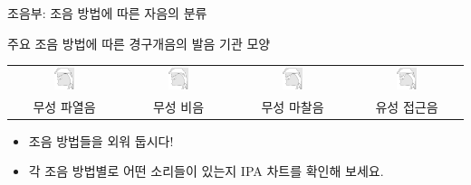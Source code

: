 \documentclass[11pt, aspectratio=169]{beamer}
\begin{document}
\begin{frame}[t]{조음부: 조음 방법에 따른 자음의 분류}
    \begin{block}{주요 조음 방법에 따른 경구개음의 발음 기관 모양}
        \centering
        \begin{tabular}{cccc}
            \includegraphics[width=0.2\textwidth]{img/Voiceless_palatal_plosive.svg.png} &  \includegraphics[width=0.2\textwidth]{img/Voiceless_palatal_nasal.svg.png} & \includegraphics[width=0.2\textwidth]{img/Voiceless_palatal_fricative_articulation.svg.png} & \includegraphics[width=0.2\textwidth]{img/Voiced_palatal_approximant.svg.png}\\
            무성 파열음 & 무성 비음 & 무성 마찰음 & 유성 접근음 
        \end{tabular}        
    \end{block}
    \vfill
    \begin{itemize}
        \item 조음 방법들을 외워 둡시다!
        \item 각 조음 방법별로 어떤 소리들이 있는지 IPA 차트를 확인해 보세요.
    \end{itemize}    
\end{frame}
\end{document}
